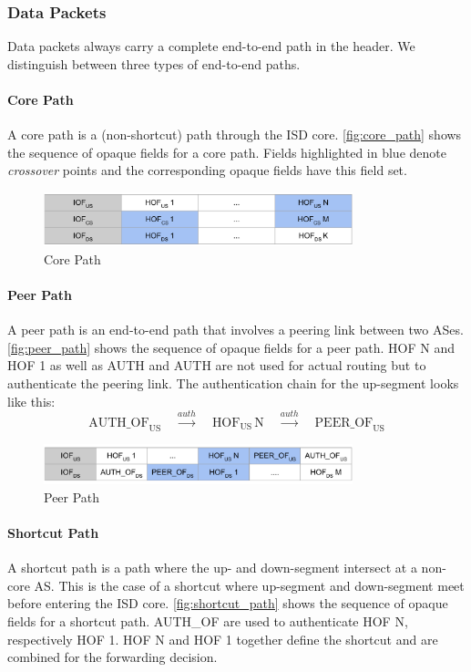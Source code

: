 \subsubsection{Data Packets}\label{sec:data_packet_processing}
Data packets always carry a complete end-to-end path in the header. We 
distinguish between three types of end-to-end paths.

\paragraph{Core Path}
A core path is a (non-shortcut) path through the ISD core. 
\autoref{fig:core_path} shows the sequence of opaque fields for a core path. 
Fields highlighted in blue denote \textit{crossover} points and the 
corresponding opaque fields have this field set.
\begin{figure}
\centering
\includegraphics[width=0.8\textwidth]{figs/core_path}
\caption{Core Path}
\label{fig:core_path}
\end{figure}

\paragraph{Peer Path}
A peer path is an end-to-end path that involves a peering link between two 
ASes. \autoref{fig:peer_path} shows the sequence of opaque fields for a peer 
path. HOF N and HOF 1 as well as AUTH and AUTH 
are not used for actual routing but to authenticate the peering link. The 
authentication chain for the up-segment looks like this:
\[
	\text{AUTH\_OF}_\text{US} \quad \xrightarrow{auth}\quad 
	\text{HOF}_\text{US} \, \text{N} \quad \xrightarrow{auth} \quad 
	\text{PEER\_OF}_\text{US}
\]

\begin{figure}
	\centering
	\includegraphics[width=0.8\textwidth]{figs/peer_path}
	\caption{Peer Path}
	\label{fig:peer_path}
\end{figure}

\paragraph{Shortcut Path}
A shortcut path is a path where the up- and down-segment intersect at a 
non-core AS. This is the case of a shortcut where up-segment and 
down-segment meet before entering the ISD core. \autoref{fig:shortcut_path} 
shows the sequence of opaque fields for a shortcut path. AUTH\_OF are used to authenticate HOF N, respectively HOF 1. 
HOF N and HOF 1 together define the shortcut and are combined 
for the forwarding decision.

